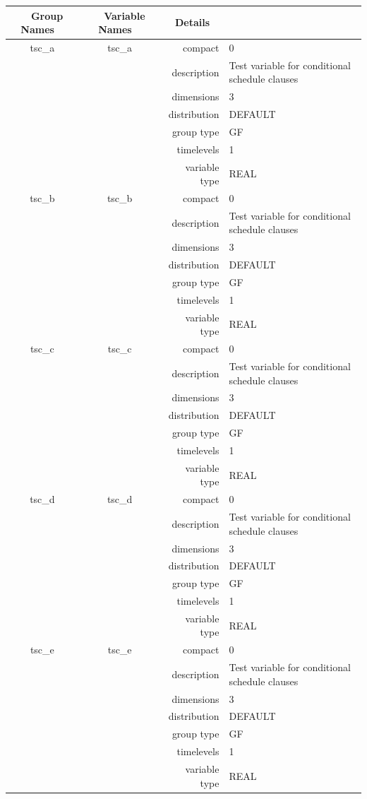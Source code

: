 \vspace{5mm}

\begin{tabular*}{150mm}{|c|c@{\extracolsep{\fill}}|rl|} \hline 
~ {\bf Group Names} ~ & ~ {\bf Variable Names} ~  &{\bf Details} ~ & ~\\ 
\hline 
tsc\_a & tsc\_a & compact & 0 \\ 
 &  & description & Test variable for conditional schedule clauses \\ 
 &  & dimensions & 3 \\ 
 &  & distribution & DEFAULT \\ 
 &  & group type & GF \\ 
 &  & timelevels & 1 \\ 
 &  & variable type & REAL \\ 
\hline 
tsc\_b & tsc\_b & compact & 0 \\ 
 &  & description & Test variable for conditional schedule clauses \\ 
 &  & dimensions & 3 \\ 
 &  & distribution & DEFAULT \\ 
 &  & group type & GF \\ 
 &  & timelevels & 1 \\ 
 &  & variable type & REAL \\ 
\hline 
tsc\_c & tsc\_c & compact & 0 \\ 
 &  & description & Test variable for conditional schedule clauses \\ 
 &  & dimensions & 3 \\ 
 &  & distribution & DEFAULT \\ 
 &  & group type & GF \\ 
 &  & timelevels & 1 \\ 
 &  & variable type & REAL \\ 
\hline 
tsc\_d & tsc\_d & compact & 0 \\ 
 &  & description & Test variable for conditional schedule clauses \\ 
 &  & dimensions & 3 \\ 
 &  & distribution & DEFAULT \\ 
 &  & group type & GF \\ 
 &  & timelevels & 1 \\ 
 &  & variable type & REAL \\ 
\hline 
tsc\_e & tsc\_e & compact & 0 \\ 
 &  & description & Test variable for conditional schedule clauses \\ 
 &  & dimensions & 3 \\ 
 &  & distribution & DEFAULT \\ 
 &  & group type & GF \\ 
 &  & timelevels & 1 \\ 
 &  & variable type & REAL \\ 
\hline 
\end{tabular*} 



